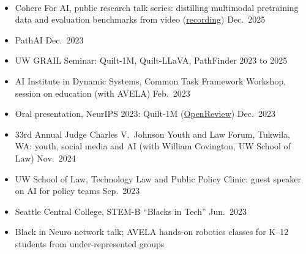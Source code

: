 \documentclass[10pt,letterpaper]{article}
\newcommand{\cvsec}[1]{\vspace{3.2mm}{\large\scshape\bfseries #1}\,\hrulefill\par\vspace{1.6mm}}
\newcommand{\cvsub}[1]{\vspace{1.5mm}{\scshape\bfseries #1}\par\vspace{0.5mm}}
\begin{document}
\cvsec{Talks}
\cvsub{Invited}
\begin{itemize}[leftmargin=1.4em,itemsep=1.5pt,topsep=2pt]
  \item Cohere For AI, public research talk series: distilling multimodal pretraining data and evaluation benchmarks from video (\href{https://youtu.be/FiCr2yUafPE}{recording}) \hfill Dec.\ 2025
  \item PathAI \hfill Dec.\ 2023
  \item UW GRAIL Seminar: Quilt-1M, Quilt-LLaVA, PathFinder \hfill 2023 to 2025
  \item AI Institute in Dynamic Systems, Common Task Framework Workshop, session on education (with AVELA) \hfill Feb.\ 2023
\end{itemize}
\cvsub{Conference}
\begin{itemize}[leftmargin=1.4em,itemsep=1.5pt,topsep=2pt]
  \item Oral presentation, NeurIPS 2023: Quilt-1M (\href{https://openreview.net/forum?id=OL2JQoO0kq}{OpenReview}) \hfill Dec.\ 2023
\end{itemize}
\cvsub{Public and Outreach}
\begin{itemize}[leftmargin=1.4em,itemsep=1.5pt,topsep=2pt]
  \item 33rd Annual Judge Charles V.\ Johnson Youth and Law Forum, Tukwila, WA: youth, social media and AI (with William Covington, UW School of Law) \hfill Nov.\ 2024
  \item UW School of Law, Technology Law and Public Policy Clinic: guest speaker on AI for policy teams \hfill Sep.\ 2023
  \item Seattle Central College, STEM-B ``Blacks in Tech'' \hfill Jun.\ 2023
  \item Black in Neuro network talk; AVELA hands-on robotics classes for K--12 students from under-represented groups
\end{itemize}
\end{document}
